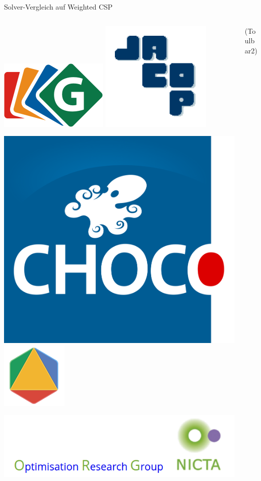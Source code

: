 \begin{frame}[fragile]{Solver-Vergleich auf Weighted CSP}
\vspace*{2ex}
\begin{columns}[onlytextwidth]
    \begin{column}{.45\textwidth}
    \centering {}

    \vspace*{1ex}

    \includegraphics[width=.2\columnwidth]{img/gecode.png}    
    \includegraphics[width=.2\columnwidth]{img/JACOP.png}
    
    \includegraphics[width=.2\columnwidth]{img/choco.png}
    \includegraphics[width=.2\columnwidth]{img/orLogo.png}

    \includegraphics[width=.5\columnwidth]{img/nictaorg.png}
	
    \end{column}
    \begin{column}{.45\textwidth}
    \centering {} (Toulbar2)

    \vspace*{1ex}
    

\end{column}
\end{columns}
\end{frame}

